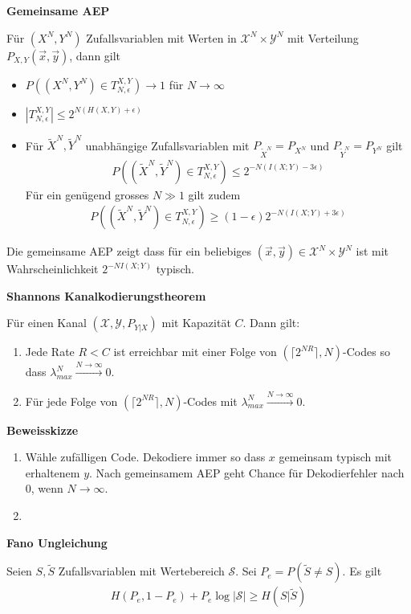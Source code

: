\documentclass[25pt]{sciposter}
\newenvironment{thm}[1]{\begin{mdframed}[nobreak=true,backgroundcolor=Emerald!10,innertopmargin=15pt, innerbottommargin=15pt]
		\textbf{#1 }
	}
	{ 
	\end{mdframed}
}
\newcommand{\TODO}[1]{\todo[inline]{\Large TODO:  #1}}
\begin{document}
\begin{multicols}{3}
\begin{thm}{Gemeinsame AEP}
	Für $(X^N, Y^N)$ Zufallsvariablen mit Werten in $\mathcal{X}^N \times \mathcal{Y}^N$ mit Verteilung $P_{X,Y}(\vec{x},\vec{y})$, dann gilt
	\begin{itemize}
		\item $P((X^N, Y^N) \in T_{N,\epsilon}^{X,Y}) \to 1$ für $N \to \infty$
		\item $|T_{N,\epsilon}^{X,Y}| \leq 2^{N(H(X,Y) + \epsilon)}$
		\item Für $\tilde{X}^N, \tilde{Y}^N$ unabhängige Zufallsvariablen mit $P_{\tilde{X}^N} = P_{X^N}$ und  $P_{\tilde{Y}^N} = P_{Y^N}$ gilt
		\begin{align*}
P((\tilde{X}^N, \tilde{Y}^N) \in T_{N,\epsilon}^{X,Y}) \leq 2^{-N(I(X;Y)-3\epsilon)}
		\end{align*}
		Für ein genügend grosses $N\gg 1$ gilt zudem
		\begin{align*}
					P((\tilde{X}^N, \tilde{Y}^N) \in T_{N,\epsilon}^{X,Y}) \geq (1-\epsilon) 2^{-N(I(X;Y) + 3 \epsilon)}
		\end{align*} 
	\end{itemize}
\end{thm}

Die gemeinsame AEP zeigt dass für ein beliebiges $(\vec{x}, \vec{y})\in \mathcal{X}^N\times \mathcal{Y}^N$ ist mit Wahrscheinlichkeit $2^{-NI(X;Y)}$ typisch.


\begin{thm}{Shannons Kanalkodierungstheorem}
	Für einen Kanal $(\mathcal{X},\mathcal{Y},P_{Y|X})$ mit Kapazität $C$.  Dann gilt:\begin{enumerate}
		\item Jede Rate $R < C$ ist erreichbar mit einer Folge von $(\lceil2^{NR}\rceil,N)$-Codes so dass $\lambda_{max}^{N} \stackrel{N\to \infty}{\longrightarrow} 0$.
		\item Für jede Folge von $(\lceil2^{NR}\rceil,N)$-Codes mit $\lambda_{max}^{N} \stackrel{N\to \infty}{\longrightarrow} 0$.
	\end{enumerate}
\end{thm}
\textbf{Beweisskizze}
\begin{enumerate}
\item Wähle zufälligen Code. Dekodiere immer so dass $x$ gemeinsam typisch mit erhaltenem $y$. Nach gemeinsamem AEP geht Chance für Dekodierfehler nach 0, wenn $N \to \infty$.
\item \TODO{todo}
\end{enumerate}

\begin{thm}{Fano Ungleichung}
	Seien $S,\tilde{S}$ Zufallsvariablen mit Wertebereich $\mathcal{S}$. Sei $P_e = P(\tilde{S} \neq S)$. Es gilt
	\begin{align*}
		H(P_e,1-P_e) + P_e \log|\mathcal{S}| \geq H(S|\tilde{S})
	\end{align*}
\end{thm}







\newpage

\end{multicols}
\end{document}
